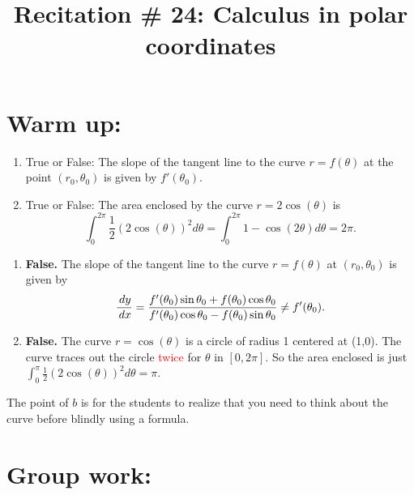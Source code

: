 \documentclass[noinstructornotest]{ximera}
\title{Recitation \# 24: Calculus in polar coordinates}
\begin{document}
\begin{abstract}		\end{abstract}
\maketitle



\section{Warm up:}
\begin{enumerate}
\item True or False:  The slope of the tangent line to the curve $r = f(\theta)$ at the point $(r_0, \theta_0)$ is given by $f'(\theta_0)$.  

\item True or False: The area enclosed by the curve $r=2\cos(\theta)$ is 
$$\int_{0}^{2\pi} \frac{1}{2} (2 \cos (\theta))^2 d \theta = \int_0^{2\pi} 1-\cos(2\theta) d\theta = 2\pi.$$
\end{enumerate}

	\begin{freeResponse}
\begin{enumerate}
\item	{\bf False.}  The slope of the tangent line to the curve $r = f(\theta)$ at $(r_0, \theta_0)$ is given by
		\[
		\frac{\,d y}{\,d x} = \frac{f'(\theta_0) \sin \theta_0 + f(\theta_0) \cos \theta_0}{f'(\theta_0) \cos \theta_0 - f(\theta_0) \sin \theta_0 } \neq f'(\theta_0).
		\]

\item {\bf False.} The curve $r=\cos(\theta)$ is a circle of radius 1 centered at (1,0). The curve traces out the circle \textcolor{red}{twice} for $\theta$ in $[0, 2\pi]$. So the area enclosed is just $\int_0^{\pi} \frac{1}{2} (2 \cos(\theta))^2 d\theta = \pi$.
\end{enumerate}
	\end{freeResponse}
	
\begin{instructorNotes}
The point of $b$ is for the students to realize that you need to think about the curve before blindly using a formula.
\end{instructorNotes}







\section{Group work:}
\end{document}
